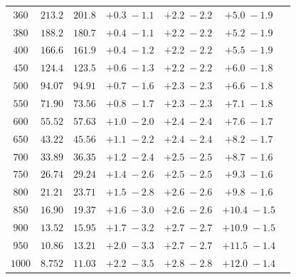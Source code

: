 \begin{table}
\begin{tabular}{ccccccc}
 $ 360$ & $  213.2$ & $  201.8$ & $ +0.3 \; -\!1.1$ & $ +2.2 \; -\!2.2$ & $ +5.0 \; -\!1.9$ \\
 $ 380$ & $  188.2$ & $  180.7$ & $ +0.4 \; -\!1.1$ & $ +2.2 \; -\!2.2$ & $ +5.2 \; -\!1.9$ \\
 $ 400$ & $  166.6$ & $  161.9$ & $ +0.4 \; -\!1.2$ & $ +2.2 \; -\!2.2$ & $ +5.5 \; -\!1.9$ \\
 $ 450$ & $  124.4$ & $  123.5$ & $ +0.6 \; -\!1.3$ & $ +2.2 \; -\!2.2$ & $ +6.0 \; -\!1.8$ \\
 $ 500$ & $  94.07$ & $  94.91$ & $ +0.7 \; -\!1.6$ & $ +2.3 \; -\!2.3$ & $ +6.6 \; -\!1.8$ \\
 $ 550$ & $  71.90$ & $  73.56$ & $ +0.8 \; -\!1.7$ & $ +2.3 \; -\!2.3$ & $ +7.1 \; -\!1.8$ \\
 $ 600$ & $  55.52$ & $  57.63$ & $ +1.0 \; -\!2.0$ & $ +2.4 \; -\!2.4$ & $ +7.6 \; -\!1.7$ \\
 $ 650$ & $  43.22$ & $  45.56$ & $ +1.1 \; -\!2.2$ & $ +2.4 \; -\!2.4$ & $ +8.2 \; -\!1.7$ \\
 $ 700$ & $  33.89$ & $  36.35$ & $ +1.2 \; -\!2.4$ & $ +2.5 \; -\!2.5$ & $ +8.7 \; -\!1.6$ \\
 $ 750$ & $  26.74$ & $  29.24$ & $ +1.4 \; -\!2.6$ & $ +2.5 \; -\!2.5$ & $ +9.3 \; -\!1.6$ \\
 $ 800$ & $  21.21$ & $  23.71$ & $ +1.5 \; -\!2.8$ & $ +2.6 \; -\!2.6$ & $ +9.8 \; -\!1.6$ \\
 $ 850$ & $  16.90$ & $  19.37$ & $ +1.6 \; -\!3.0$ & $ +2.6 \; -\!2.6$ & $ +10.4 \; -\!1.5$ \\
 $ 900$ & $  13.52$ & $  15.95$ & $ +1.7 \; -\!3.2$ & $ +2.7 \; -\!2.7$ & $ +10.9 \; -\!1.5$ \\
 $ 950$ & $  10.86$ & $  13.21$ & $ +2.0 \; -\!3.3$ & $ +2.7 \; -\!2.7$ & $ +11.5 \; -\!1.4$ \\
 $1000$ & $  8.752$ & $  11.03$ & $ +2.2 \; -\!3.5$ & $ +2.8 \; -\!2.8$ & $ +12.0 \; -\!1.4$ \\
\hline
\end{tabular}
\label{tab:NNLO7TeV}
\end{table}

